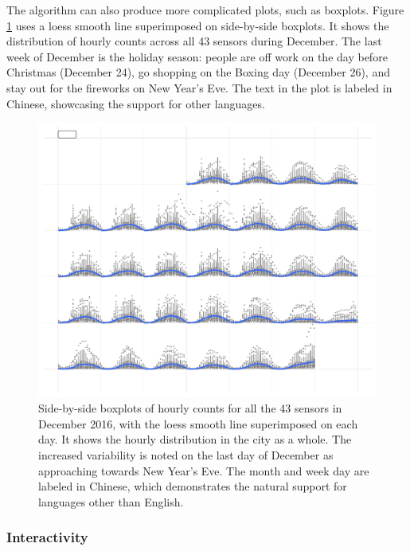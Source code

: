 \documentclass[12pt]{article}
\begin{document}
The algorithm can also produce more complicated plots, such as boxplots. Figure \ref{fig:chn} uses a loess smooth line \citep{cleveland1979loess} superimposed on side-by-side boxplots. It shows the distribution of hourly counts across all 43 sensors during December. The last week of December is the holiday season: people are off work on the day before Christmas (December 24), go shopping on the Boxing day (December 26), and stay out for the fireworks on New Year's Eve. The text in the plot is labeled in Chinese, showcasing the support for other languages.

\begin{figure}

{\centering \includegraphics[width=\textwidth]{figure/chn-1} 

}

\caption{Side-by-side boxplots of hourly counts for all the 43 sensors in December 2016, with the loess smooth line superimposed on each day. It shows the hourly distribution in the city as a whole. The increased variability is noted on the last day of December as approaching towards New Year's Eve. The month and week day are labeled in Chinese, which demonstrates the natural support for languages other than English.}\label{fig:chn}
\end{figure}



\hypertarget{interactivity}{%
\subsubsection{Interactivity}\label{interactivity}}
\end{document}
